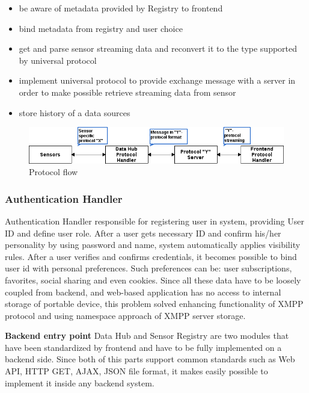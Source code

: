     \begin{itemize}
    \item be aware of metadata provided by Registry to frontend
    \item bind metadata from registry and user choice
    \item get and parse sensor streaming data and reconvert it to the type supported by universal protocol
    \item implement universal protocol to provide exchange message with a server in order to make possible retrieve streaming data from sensor
    \item store history of a data sources
    \end{itemize}

      \begin{figure}[!ht]
      \centering
      \includegraphics[scale=0.6]{images/Protocol_flow.png}   
      \caption[Protocol flow]{Protocol flow}
      \label{img:protocol}                           
      \end{figure}

    \subsubsection{Authentication Handler}
    Authentication Handler responsible for registering user in system, providing User ID and define user role. After a user gets necessary ID and confirm his/her personality by using password and name, system automatically applies visibility rules. After a user verifies and confirms credentials, it becomes possible to bind user id with personal preferences. Such preferences can be: user subscriptions, favorites, social sharing and even cookies. Since all these data have to be loosely coupled from backend, and web-based application has no access to internal storage of portable device, this problem solved enhancing functionality of XMPP protocol and using namespace approach of XMPP server storage.

    \textbf{Backend entry point}
    Data Hub and Sensor Registry are two modules that have been standardized by frontend and have to be fully implemented on a backend side. Since both of this parts support common standards such as Web API, HTTP GET, AJAX, JSON file format, it makes easily possible to implement it inside any backend system.

